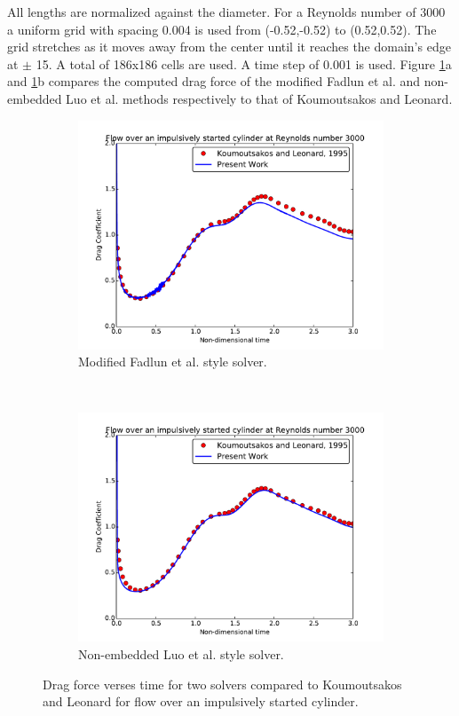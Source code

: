 \documentclass[onehalf,11pt]{beavtex}
\begin{document}
All lengths are normalized against the diameter.
For a Reynolds number of 3000 a uniform grid with spacing 0.004 is used from (-0.52,-0.52) to (0.52,0.52).
The grid stretches as it moves away from the center until it reaches the domain's edge at $\pm$ 15.
A total of 186x186 cells are used.
A time step of 0.001 is used.
Figure \ref{fig:cy3000}a and \ref{fig:cy3000}b compares the computed drag force of the modified Fadlun et al. and non-embedded Luo et al. methods respectively to that of Koumoutsakos and Leonard.
\begin{figure}[h]
	\centering
	\begin{subfigure}{0.4\textwidth}
		\includegraphics[width=\linewidth]{cy3000fadlun}
		\caption{Modified Fadlun et al. style solver.}
	\end{subfigure}
	~
	\begin{subfigure}{0.4\textwidth}
		\includegraphics[width=\linewidth]{cy3000luo}
		\caption{Non-embedded Luo et al. style solver.}
	\end{subfigure}
	\caption{Drag force verses time for two solvers compared to Koumoutsakos and Leonard for flow over an impulsively started cylinder.}
	\label{fig:cy3000}
\end{figure}
\end{document}
